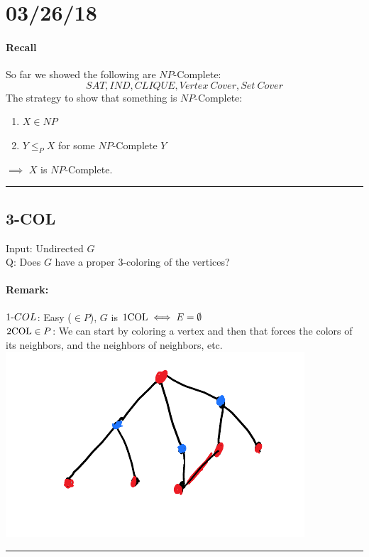 \documentclass[12 pt]{article}
\begin{document}
          \section{03/26/18}
          \paragraph{Recall}
          So far we showed the following are $NP$-Complete:
          $$SAT,IND,CLIQUE,Vertex\ Cover, Set\ Cover$$
          The strategy to show that something is $NP$-Complete:
          \begin{enumerate}
          \item $X \in NP$
          \item $Y \leq_P X$ for some $NP$-Complete $Y$
          \end{enumerate}
          $\implies$ $X$ is $NP$-Complete.
          \\ \noindent \rule{\textwidth}{0.5pt}
          \subsection{3-COL}
          Input: Undirected $G$
          \\ Q: Does $G$ have a proper $3$-coloring of the vertices?
          \paragraph{Remark:} $1\hbox{-}COL$: Easy ($\in P$), $G$ is
          $1\hbox{COL} \iff E = \emptyset$
          \\ $2\hbox{COL}\in P$: We can start by coloring a vertex and
          then that forces the colors of its neighbors, and the
          neighbors of neighbors, etc.
          \\ \includegraphics[width=.9\textwidth]{i133.pdf}
          \\ \noindent \rule{\textwidth}{0.5pt}
\end{document}
